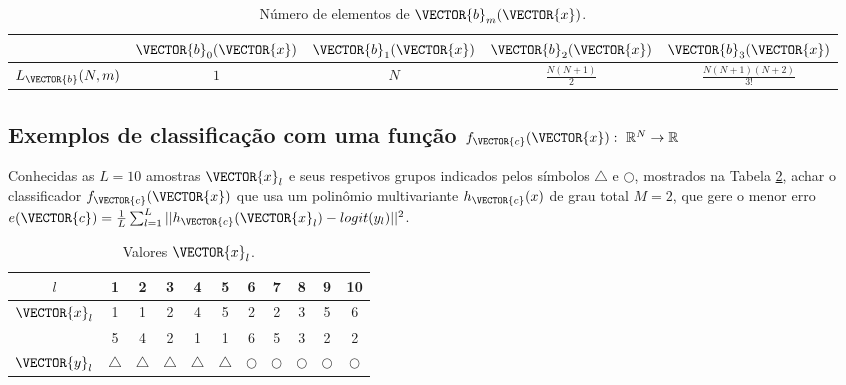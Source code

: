 \begin{table}[h!]
\centering
\begin{tabular}{|c||c|c|c|c|} 
 \hline
~        & $\VECTOR{b}_0(\VECTOR{x})$ & $\VECTOR{b}_1(\VECTOR{x})$ & $\VECTOR{b}_2(\VECTOR{x})$ & $\VECTOR{b}_3(\VECTOR{x})$  \\ \hline
$L_{\VECTOR{b}}(N,m)$ & $1$ & $N$ & $\frac{N(N+1)}{2}$ & $\frac{N(N+1)(N+2)}{3!}$\\ \hline
\end{tabular}
\caption{Número de elementos de $\VECTOR{b}_m(\VECTOR{x})$.}
\label{table:theo:reglogrnr1poly:bm}
\end{table}

\subsection{Exemplos de classificação com uma função
$f_{\VECTOR{c}}(\VECTOR{x}):~\mathbb{R}^N \rightarrow \mathbb{R}$ }

\begin{example}\label{ex:theo:reglogrnr1poly}
Conhecidas as $L=10$ amostras $\VECTOR{x}_l$ e seus respetivos grupos indicados pelos símbolos $\bigtriangleup$ e $\bigcirc$, 
mostrados na Tabela \ref{table:theo:reglogrnr1poly:xn},
achar o classificador $f_{\VECTOR{c}}(\VECTOR{x})$ que usa um polinômio multivariante $h_{\VECTOR{c}}(x)$
de grau total $M=2$, 
que gere o menor erro $e(\VECTOR{c}) =  \frac{1}{L}\sum_{l=1}^{L} ||h_{\VECTOR{c}}(\VECTOR{x}_l)-logit(y_l)||^2$.
\end{example}


\begin{table}[h!]
\centering
\begin{tabular}{|c||c|c|c|c|c||c|c|c|c|c||} 
 \hline
$l$            & 1 & 2 & 3 & 4 & 5 & 6 & 7 & 8 & 9 & 10 \\ \hline \hline
$\VECTOR{x}_l$ & 1 & 1 & 2 & 4 & 5 & 2 & 2 & 3 & 5 & 6 \\ 
~              & 5 & 4 & 2 & 1 & 1 & 6 & 5 & 3 & 2 & 2 \\ \hline
$\VECTOR{y}_l$ & $\bigtriangleup$ & $\bigtriangleup$ & $\bigtriangleup$ & $\bigtriangleup$ & $\bigtriangleup$ 
      & $\bigcirc$ & $\bigcirc$ & $\bigcirc$ & $\bigcirc$ & $\bigcirc$\\ \hline
\end{tabular}
\caption{Valores $\VECTOR{x}_l$.}
\label{table:theo:reglogrnr1poly:xn}
\end{table}


